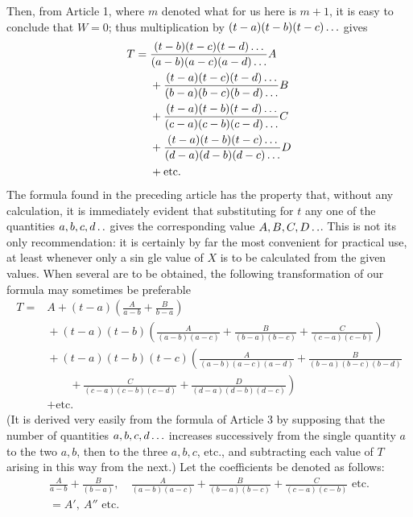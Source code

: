 Then, from Article 1, where $m$ denoted what for us here is $m+1$, it is easy to conclude that $W=0$; thus multiplication by $(t-a)(t-b)(t-c)\mathinner{.\,.\,.}$ gives
\[
\begin{aligned}
T={}&\frac{(t-b)(t-c)(t-d)\mathinner{.\,.\,.}}{(a-b)(a-c)(a-d)\mathinner{.\,.\,.}}A\\
&{}+\frac{(t-a)(t-c)(t-d)\mathinner{.\,.\,.}}{(b-a)(b-c)(b-d)\mathinner{.\,.\,.}}B\\
&{}+\frac{(t-a)(t-b)(t-d)\mathinner{.\,.\,.}}{(c-a)(c-b)(c-d)\mathinner{.\,.\,.}}C\\
&{}+\frac{(t-a)(t-b)(t-c)\mathinner{.\,.\,.}}{(d-a)(d-b)(d-c)\mathinner{.\,.\,.}}D\\
&{}+\text{etc.}
\end{aligned}
\]
The formula found in the preceding article has the property that, without any calculation, it is immediately evident that substituting for $t$ any one of the quantities $a,b,c,d\mathinner{.\,.}$ gives the
corresponding value $A,B,C,D\mathinner{.\,.}$. This is not its only recommendation: it is certainly by far the most convenient for practical use, at least whenever only a sin%
gle value of $X$ is to be calculated from the given values. When several
are to be obtained, the following transformation of our formula may sometimes
be preferable
\[
\begin{aligned}
T={}&A+(t-a)\left(\frac{A}{a-b}+\frac{B}{b-a}\right)\\
&{}+(t-a)(t-b)\left(\frac{A}{(a-b)(a-c)}+\frac{B}{(b-a)(b-c)}+\frac{C}{(c-a)(c-b)}\right)\\
&{}+(t-a)(t-b)(t-c)\left(\frac{A}{(a-b)(a-c)(a-d)}+\frac{B}{(b-a)(b-c)(b-d)}\right.\\
&\qquad\left.{}+\frac{C}{(c-a)(c-b)(c-d)}+\frac{D}{(d-a)(d-b)(d-c)}\right)\\
&{}+\text{etc.}
\end{aligned}
\]
(It is derived very easily from the formula of Article 3 by supposing that the number of quantities
$a,b,c,d\mathinner{.\,.\,.}$ increases successively from the single quantity $a$ to the two $a,b$, then to the three $a,b,c$, etc.,
and subtracting each value of $T$ arising in this way from the next.)
Let the coefficients be denoted as follows:
\[
\begin{gathered}\frac{A}{a-b}+\frac{B}{(b-a)},\quad
\frac{A}{(a-b)(a-c)}+\frac{B}{(b-a)(b-c)}+\frac{C}{(c-a)(c-b)}\text{ etc.}\\
=A',\ A''\text{ etc.}\end{gathered}
\]
